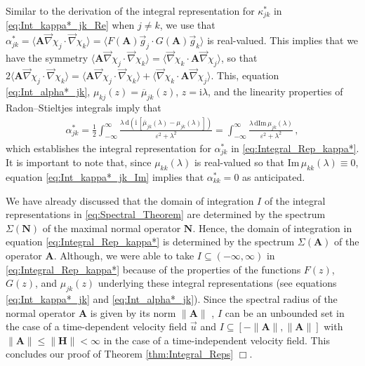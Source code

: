 \documentclass[11pt]{amsart}
\newcommand{\I}{\mathrm{i}}
\renewcommand{\d}{\mathrm{d}}
\newcommand{\Hb}{\mathbf{H}}
\newcommand{\Ab}{\mathbf{A}}
\newcommand{\Nb}{\mathbf{N}}
\begin{document}
Similar to the derivation of the integral representation for
$\kappa^*_{jk}$ in \eqref{eq:Int_kappa*_jk_Re} when $j\neq k$, we use that
$\alpha^*_{jk}=\langle\Ab\vec{\nabla}\chi_j\cdot\vec{\nabla}\chi_k\rangle=\langle
F(\Ab)\vec{g}_j\cdot G(\Ab)\vec{g}_k\rangle$ is real-valued. This implies that we
have the symmetry
$\langle\Ab\vec{\nabla}\chi_j\cdot\vec{\nabla}\chi_k\rangle=\langle\vec{\nabla}\chi_k\cdot\Ab\vec{\nabla}\chi_j\rangle$, so that
$2\langle\Ab\vec{\nabla}\chi_j\cdot\vec{\nabla}\chi_k\rangle=\langle\Ab\vec{\nabla}\chi_j\cdot\vec{\nabla}\chi_k\rangle+\langle\vec{\nabla}\chi_k\cdot\Ab\vec{\nabla}\chi_j\rangle$.
This, equation \eqref{eq:Int_alpha*_jk},
$\mu_{kj}(z)=\overline{\mu}_{jk}(z)$, $z=\I\lambda$, and the
linearity properties of Radon--Stieltjes integrals \cite{Stone:64}
imply that 
% 
\begin{align}\label{eq:Int_kappa*_jk_Im}
  \alpha^*_{jk}
       =\frac{1}{2}\int_{-\infty}^\infty\frac{\lambda\,\d(\I\,[\overline{\mu}_{jk}(\lambda)-\mu_{jk}(\lambda)])}{\varepsilon^2+\lambda^2}
       =\int_{-\infty}^\infty\frac{\lambda\,\d\text{Im}\,\mu_{jk}(\lambda)}{\varepsilon^2+\lambda^2}\,,            
\end{align}
%
which establishes the integral representation for $\alpha^*_{jk}$ in
\eqref{eq:Integral_Rep_kappa*}. It is important to note that, since
$\mu_{kk}(\lambda)$ is real-valued so that $\text{Im}\,\mu_{kk}(\lambda)\equiv0$, equation
\eqref{eq:Int_kappa*_jk_Im} implies that $\alpha^*_{kk}=0$ as anticipated. 



We have already discussed that the domain of integration $I$ of the
integral representations in \eqref{eq:Spectral_Theorem} are determined
by the spectrum $\Sigma(\Nb)$ of the maximal normal operator $\Nb$. Hence,
the domain of integration in equation \eqref{eq:Integral_Rep_kappa*}
is determined by the spectrum $\Sigma(\Ab)$ of the operator
$\Ab$. Although, we were able to take $I\subseteq(-\infty,\infty)$ in
\eqref{eq:Integral_Rep_kappa*} because of the properties of the
functions $F(z)$, $G(z)$, and $\mu_{jk}(z)$ underlying these integral
representations (see equations \eqref{eq:Int_kappa*_jk} and
\eqref{eq:Int_alpha*_jk}). Since the spectral radius of the normal
operator $\Ab$ is given by its norm $\|\Ab\|$ \cite{Reed-1980}, $I$ can
be an unbounded set in the case of a time-dependent velocity field
$\vec{u}$ and $I\subseteq[-\|\Ab\|,\|\Ab\|]$ with $\|\Ab\|\leq\|\Hb\|<\infty$ in the case of a
time-independent velocity field. This concludes our proof of Theorem
\ref{thm:Integral_Reps} $\Box$.    
\end{document}
